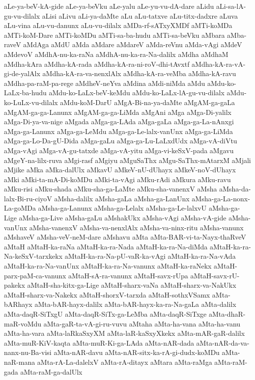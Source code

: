 {aLe-ya-beV-kA-gide
aLe-ya-beVku
aLe-yalu
aLe-yu-vu-dA-dare
aLidu
aLi-sa-lA-gu-vu-dilalx
aLisi
aLivu
aLi-ya-daMte
aLu
aLu-tatxve
aLu-titx-dadxre
aLuva
aLu-vina
aLu-vu-danunx
aLu-vu-dilalx
aMDa-rf-sATxyXMDf
aMTi-koMDa
aMTi-koM-Dare
aMTi-koMDu
aMTi-sa-ba-hudu
aMTi-sa-beVku
aMbara
aMba-raveV
aMdAga
aMdU
aMda
aMdare
aMdareV
aMda-reVnu
aMda-vAgi
aMdeV
aMdevoV
aMdhA-nu-ka-raNa
aMdhA-nu-ka-ra-Na-dalilx
aMdha
aMdhaM
aMdha-kAra
aMdha-kA-rada
aMdha-kA-ra-ni-roV-dhi-tAvxtf
aMdha-kA-ra-vA-gi-de-yalAlx
aMdha-kA-ra-va-nenxlAlx
aMdha-kA-ra-veMba
aMdha-kA-ravu
aMdha-pa-raM-pa-rege
aMdheV-neYva
aMdina
aMdi-niMda
aMdu
aMdu-ko-LaLx-ba-hudu
aMdu-ko-LaLx-beV-keMdu
aMdu-ko-LaLx-lA-gu-vu-dilalx
aMdu-ko-LuLx-vu-dilalx
aMdu-koM-DarU
aMgA-Bi-na-ya-daMte
aMgAM-ga-gaLa
aMgAM-ga-ga-Lanunx
aMgAM-ga-ga-LiMda
aMgAni
aMga
aMga-Di-yalilx
aMga-Di-ya-va-nige
aMgada
aMga-ga-LAda
aMga-gaLa
aMga-ga-La-nAnxgi
aMga-ga-Lanunx
aMga-ga-LeMdu
aMga-ga-Le-lalx-vanUnx
aMga-ga-LiMda
aMga-ga-Lo-Da-gU-Dida
aMga-gaLu
aMga-ga-Lu-LaLxdUdx
aMga-vA-diVtu
aMga-vAgi
aMga-vA-gu-tatxde
aMga-vA-yitu
aMga-vi-keSxV-pada
aMgavu
aMgeY-na-lilx-ruva
aMgi-rasf
aMgiyu
aMguSaThx
aMgu-SaThx-mAtarxM
aMjali
aMjike
aMka
aMka-dalUlx
aMkavU
aMkeV-nU-dUhayx
aMkeV-noV-dUhayx
aMki
aMki-ta-mA-Di-koMDu
aMki-ta-vAgi
aMku-rAdi
aMkura
aMku-ravu
aMku-risi
aMku-shada
aMku-sha-ga-LaMte
aMku-sha-vanenxV
aMsha
aMsha-da-lalx-Bi-ru-ciyoV
aMsha-dalilx
aMsha-gaLa
aMsha-ga-LanUnx
aMsha-ga-La-nonx-La-goMDa
aMsha-ga-Lanunx
aMsha-ga-Lelalx
aMsha-ga-Le-lalxvU
aMsha-ga-Lige
aMsha-ga-Live
aMsha-gaLu
aMshakUkx
aMsha-vAgi
aMsha-vA-gide
aMsha-vanUnx
aMsha-vanenxV
aMsha-va-nenxlAlx
aMsha-va-ninx-ritu
aMsha-vanunx
aMshaveV
aMsha-veV-neM-dare
aMshavu
aMta
aMta-BAR-vi-ta-Nayx-thaRveV
aMtaH
aMtaH-ka-raNa
aMtaH-ka-ra-Nada
aMtaH-ka-ra-Na-diMda
aMtaH-ka-ra-Na-keSxV-tarxkekx
aMtaH-ka-ra-Na-pU-vaR-ka-vAgi
aMtaH-ka-ra-Na-vAda
aMtaH-ka-ra-Na-vanUnx
aMtaH-ka-ra-Na-vanunx
aMtaH-ka-raNekx
aMtaH-parx-paM-ca-vanunx
aMtaH-sA-ra-vanunx
aMtaH-savx-rUpa
aMtaH-savx-rU-pakekx
aMtaH-sha-kitx-ga-Lige
aMtaH-sharx-vaNa
aMtaH-sharx-va-NakUkx
aMtaH-sharx-va-Nakekx
aMtaH-shorxV-tarxda
aMtaH-sothxVSamx
aMta-bARhayx
aMta-bAR-hayx-dalilx
aMta-bAR-hayx-ka-ra-Na-gaLa
aMta-dalilx
aMta-daqR-SiTxgU
aMta-daqR-SiTx-ga-LeMba
aMta-daqR-SiTxge
aMta-dhaR-maR-voMdu
aMta-gaR-ta-vA-gi-ru-vuvu
aMtaha
aMta-ha-vana
aMta-ha-vanu
aMta-ha-vara
aMta-laRkaSxyXM
aMta-laR-kaSxyXkekx
aMta-mAR-gaR-dalilx
aMta-muR-KiV-kaqta
aMta-muR-Ki-ga-LAda
aMta-nAR-dada
aMta-nAR-da-va-nanx-nu-Ba-visi
aMta-nAR-davu
aMta-nAR-sitx-ka-rA-gi-dudx-koMDu
aMta-naR-mana
aMta-rA-La-dalelxV
aMta-rA-ditayx
aMtara
aMta-raMga
aMta-raM-gada
aMta-raM-ga-dalUlx
}

